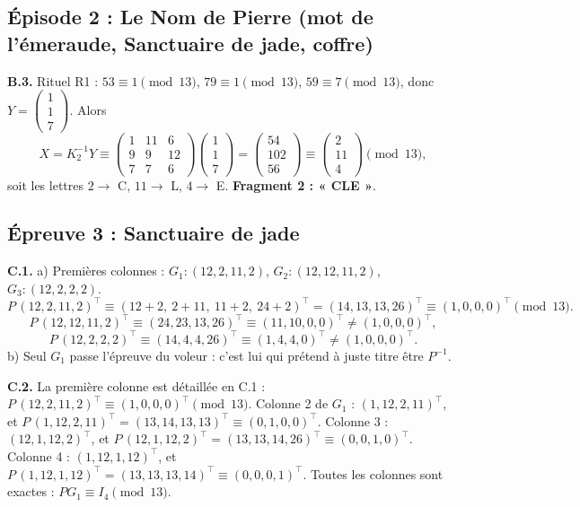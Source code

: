 \documentclass[11pt,a4paper]{article}
\begin{document}
	\subsection*{Épisode 2 : Le Nom de Pierre (mot de l'émeraude, Sanctuaire de jade, coffre)}
	
	\textbf{B.3.} Rituel R1 : $53 \equiv 1 \pmod{13}$,
	$79 \equiv 1 \pmod{13}$, $59 \equiv 7 \pmod{13}$, donc
	$Y = \begin{pmatrix}1\\1\\7\end{pmatrix}$.
	Alors
	\[
	X = K_2^{-1}Y \equiv \begin{pmatrix}1&11&6\\9&9&12\\7&7&6\end{pmatrix}
	\begin{pmatrix}1\\1\\7\end{pmatrix}
	= \begin{pmatrix}54\\102\\56\end{pmatrix}
	\equiv \begin{pmatrix}2\\11\\4\end{pmatrix} \pmod{13},
	\]
	soit les lettres $2 \to$ C, $11 \to$ L, $4 \to$ E.
	\textbf{Fragment 2 : « CLE »}.
	
	\subsection*{Épreuve 3 : Sanctuaire de jade}
	\textbf{C.1.} a) Premières colonnes :
	$G_1 : (12,2,11,2)$, $G_2 : (12,12,11,2)$, $G_3 : (12,2,2,2)$.
	\[
	P\,(12,2,11,2)^{\!\top} \equiv (12+2,\ 2+11,\ 11+2,\ 24+2)^{\!\top}
	= (14,13,13,26)^{\!\top} \equiv (1,0,0,0)^{\!\top} \pmod{13}.
	\]
	\[
	P\,(12,12,11,2)^{\!\top} \equiv (24,23,13,26)^{\!\top}
	\equiv (11,10,0,0)^{\!\top} \neq (1,0,0,0)^{\!\top},
	\]
	\[
	P\,(12,2,2,2)^{\!\top} \equiv (14,4,4,26)^{\!\top}
	\equiv (1,4,4,0)^{\!\top} \neq (1,0,0,0)^{\!\top}.
	\]
	b) Seul $G_1$ passe l'épreuve du voleur : c'est lui qui prétend à juste
	titre être $P^{-1}$.
	
	\textbf{C.2.} La première colonne est détaillée en C.1 :
	$P\,(12,2,11,2)^{\!\top} \equiv (1,0,0,0)^{\!\top} \pmod{13}$.
	Colonne 2 de $G_1$ : $(1,12,2,11)^{\!\top}$, et
	$P\,(1,12,2,11)^{\!\top} = (13,14,13,13)^{\!\top}
	\equiv (0,1,0,0)^{\!\top}$. Colonne 3 : $(12,1,12,2)^{\!\top}$, et
	$P\,(12,1,12,2)^{\!\top} = (13,13,14,26)^{\!\top}
	\equiv (0,0,1,0)^{\!\top}$. Colonne 4 : $(1,12,1,12)^{\!\top}$, et
	$P\,(1,12,1,12)^{\!\top} = (13,13,13,14)^{\!\top}
	\equiv (0,0,0,1)^{\!\top}$. Toutes les colonnes sont exactes :
	$P G_1 \equiv I_4 \pmod{13}$.
	
\end{document}

